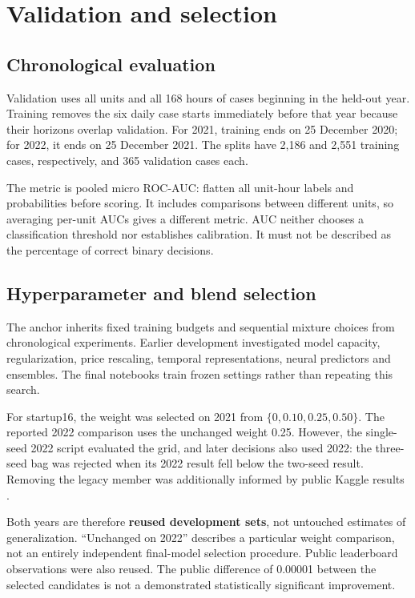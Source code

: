 \documentclass[a4paper,11pt]{article}
\begin{document}
\section{Validation and selection}
\subsection*{Chronological evaluation}
Validation uses all units and all 168 hours of cases beginning in the held-out year. Training removes the six daily case starts immediately before that year because their horizons overlap validation. For 2021, training ends on 25 December 2020; for 2022, it ends on 25 December 2021. The splits have 2,186 and 2,551 training cases, respectively, and 365 validation cases each.

The metric is pooled micro ROC-AUC: flatten all unit-hour labels and probabilities before scoring. It includes comparisons between different units, so averaging per-unit AUCs gives a different metric. AUC neither chooses a classification threshold nor establishes calibration. It must not be described as the percentage of correct binary decisions.

\subsection*{Hyperparameter and blend selection}
The anchor inherits fixed training budgets and sequential mixture choices from chronological experiments. Earlier development investigated model capacity, regularization, price rescaling, temporal representations, neural predictors and ensembles. The final notebooks train frozen settings rather than repeating this search.

For startup16, the weight was selected on 2021 from $\{0,0.10,0.25,0.50\}$. The reported 2022 comparison uses the unchanged weight 0.25. However, the single-seed 2022 script evaluated the grid, and later decisions also used 2022: the three-seed bag was rejected when its 2022 result fell below the two-seed result. Removing the legacy member was additionally informed by public Kaggle results \cite{supplied}.

Both years are therefore \textbf{reused development sets}, not untouched estimates of generalization. ``Unchanged on 2022'' describes a particular weight comparison, not an entirely independent final-model selection procedure. Public leaderboard observations were also reused. The public difference of 0.00001 between the selected candidates is not a demonstrated statistically significant improvement.
\end{document}
